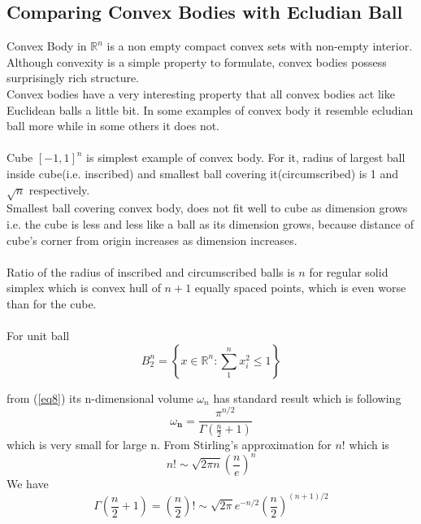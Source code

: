 \documentclass[oneside]{book}
\begin{document}
	\subsection{Comparing Convex Bodies with Ecludian Ball}\label{ss:20}
	Convex Body  in  $\mathbb{R}^n$  is a non empty compact convex sets with non-empty interior.\\
	Although convexity is a simple property to formulate, convex bodies possess  surprisingly rich structure.\\
	Convex bodies have a very interesting property that all convex bodies act like Euclidean balls a little bit. In some examples of convex body it resemble ecludian ball more while in some others it does not.\\\\
	Cube $[-1,1]^{n}$ is simplest example of convex body. For it, radius of largest ball inside cube(i.e. inscribed) and smallest ball covering it(circumscribed) is 1 and $\sqrt{n} $ respectively.
	\\
	Smallest  ball covering convex body, does not fit well to cube as dimension grows i.e. the cube is less and less like a ball as its dimension grows, because distance of cube's corner from origin increases as dimension increases.\\\\
	Ratio of the radius of inscribed and circumscribed balls is $ n $ for regular solid simplex which is convex hull of $ n + 1$  equally spaced points,  which is even worse than for the cube.
	\\\\
	
	
	
	For unit ball $$B_{2}^{n}=\left\{x \in \mathbb{R}^{n}: \sum_{1}^{n} x_{i}^{2} \leq 1\right\}$$
	
	from (\ref{eq8})
	its n-dimensional volume  $\omega_{{n}}$ has standard result which is following
	\\
	$$\omega_{\mathbf{n} }  =\frac{\pi^{n / 2}}{\Gamma\left(\frac{n}{2}+1\right)} $$
	which is very small for large n. From Stirling's approximation for $ n!$
	which is 
	$$n ! \sim \sqrt{2 \pi n}\left(\frac{n}{e}\right)^{n}$$
	We have 
	$$\Gamma\left(\frac{n}{2}+1\right) = \left(\frac{n}{2}\right)! \sim \sqrt{2 \pi} e^{-n / 2}\left(\frac{n}{2}\right)^{(n+1) / 2}$$
	
\end{document}
